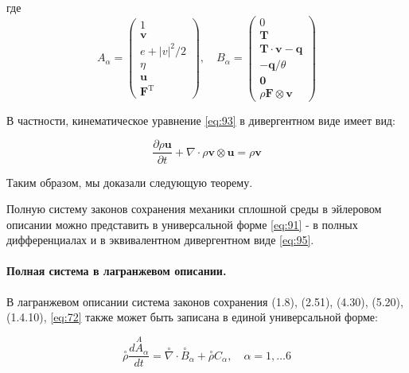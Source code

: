 где
\begin{equation}
A_{\alpha}=\left(\begin{array}{c}
1  \label{eq:96}\\
\mathbf{v} \\
e+|v|^{2} / 2 \\
\eta \\
\mathbf{u} \\
\mathbf{F}^{\mathrm{T}}
\end{array}\right), \quad B_{\alpha}=\left(\begin{array}{c}
0 \\
\mathbf{T} \\
\mathbf{T} \cdot \mathbf{v}-\mathbf{q} \\
-\mathbf{q} / \theta \\
\mathbf{0} \\
\rho \mathbf{F} \otimes \mathbf{v}
\end{array}\right)
\end{equation}

В частности, кинематическое уравнение \eqref{eq:93} в дивергентном виде имеет вид:

\begin{equation}
\frac{\partial \rho \mathbf{u}}{\partial t}+\nabla \cdot \rho \mathbf{v} \otimes \mathbf{u}=\rho \mathbf{v} \label{eq:97}
\end{equation}

Таким образом, мы доказали следующую теорему.

\begin{theorem}
Полную систему законов сохранения механики сплошной среды в эйлеровом описании можно представить в универсальной форме \eqref{eq:91} - в полных дифференциалах и в эквивалентном дивергентном виде \eqref{eq:95}.
\end{theorem} 

\paragraph{Полная система в лагранжевом описании.} В лагранжевом описании система законов сохранения (1.8), (2.51), (4.30), (5.20), (1.4.10), \eqref{eq:72} также может быть записана в единой универсальной форме:

\begin{equation}
\stackrel{\circ}{\rho} \frac{d \stackrel{A}{A}_{\alpha}}{d t}=\stackrel{\circ}{\nabla} \cdot \stackrel{\circ}{B}_{\alpha}+\stackrel{\circ}{\rho} C_{\alpha}, \quad \alpha=1, \ldots 6 \label{eq:98}
\end{equation}


